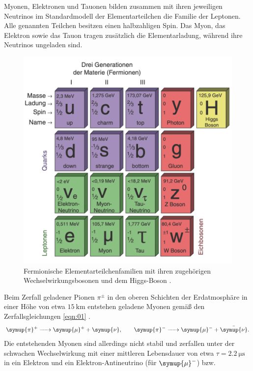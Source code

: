 \noindent Myonen, Elektronen und Tauonen bilden zusammen mit ihren jeweiligen
Neutrinos im Standardmodell der Elementarteilchen die Familie der Leptonen. Alle
genannten Teilchen besitzen einen halbzahligen Spin. Das Myon, das Elektron
sowie das Tauon tragen zusätzlich die Elementarladung, während ihre Neutrinos
ungeladen sind.
\begin{figure}
  \centering
  \includegraphics[scale=0.5]{resources/standardmodell.png}
  \caption{Fermionische Elementarteilchenfamilien mit ihren zugehörigen
  Wechselwirkungsbosonen und dem Higgs-Boson \cite{großforschung}.}
  \label{fig:01}
\end{figure}
\noindent Beim Zerfall geladener Pionen $\pi^{\pm}$ in den oberen Schichten
der Erdatmosphäre in einer Höhe von etwa $\SI{15}{\kilo\meter}$ entstehen
geladene Myonen gemäß den Zerfallsgleichungen \ref{eqn:01} \cite{grupen}.
\begin{align}
  \ce{\symup{\pi}+ -> \symup{\mu}+ + \symup{\nu}}, \qquad
  \ce{\symup{\pi}- -> \symup{\mu}- + \bar{\symup{\nu}}}.
  \label{eqn:01}
\end{align}
\noindent Die entstehenden Myonen sind allerdings nicht stabil und zerfallen
unter der schwachen Wechselwirkung
mit einer mittleren Lebensdauer von etwa $\tau = \SI{2.2}{\micro\second}$ in
ein Elektron und ein Elektron-Antineutrino (für $\ce{\symup{\mu}- }$) bzw.
